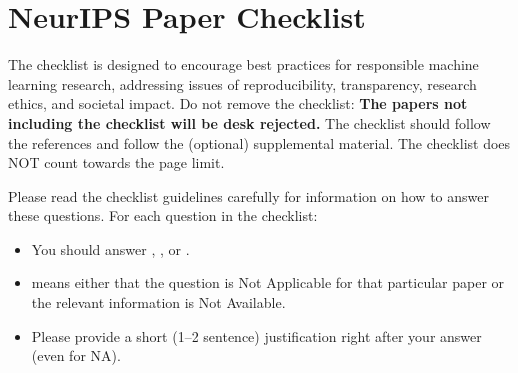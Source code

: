 \documentclass{article}
\begin{document}

\newpage
\section*{NeurIPS Paper Checklist}

The checklist is designed to encourage best practices for responsible machine learning research, addressing issues of reproducibility, transparency, research ethics, and societal impact. Do not remove the checklist: {\bf The papers not including the checklist will be desk rejected.} The checklist should follow the references and follow the (optional) supplemental material.  The checklist does NOT count towards the page
limit. 

Please read the checklist guidelines carefully for information on how to answer these questions. For each question in the checklist:
\begin{itemize}
    \item You should answer \answerYes{}, \answerNo{}, or \answerNA{}.
    \item \answerNA{} means either that the question is Not Applicable for that particular paper or the relevant information is Not Available.
    \item Please provide a short (1–2 sentence) justification right after your answer (even for NA). 
\end{itemize}
\end{document}
